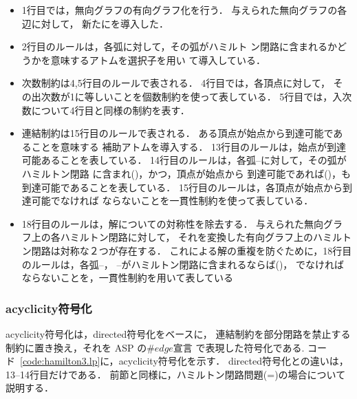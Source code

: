 \begin{itemize}
\item 1行目では，無向グラフの有向グラフ化を行う．
  与えられた無向グラフの各辺に対して，
  新たにを導入した．
\item 2行目のルールは，各弧に対して，その弧がハミルト
  ン閉路に含まれるかどうかを意味するアトムを選択子を用い
  て導入している．
\item 次数制約は4,5行目のルールで表される．
  4行目では，各頂点に対して，
  その出次数が1に等しいことを個数制約を使って表している．
  5行目では，入次数について4行目と同様の制約を表す．
\item 連結制約は15行目のルールで表される．
  ある頂点が始点から到達可能であることを意味する
  補助アトムを導入する．
  13行目のルールは，始点が到達可能あることを表している．
  14行目のルールは，各弧--に対して，その弧がハミルトン閉路
  に含まれ()，かつ，頂点が始点から
  到達可能であれば()，も到達可能であることを表している．
  15行目のルールは，各頂点が始点から到達可能でなければ
  ならないことを一貫性制約を使って表している．
\item 18行目のルールは，解についての対称性を除去する．
  与えられた無向グラフ上の各ハミルトン閉路に対して，
  それを変換した有向グラフ上のハミルトン閉路は対称な２つが存在する．
  これによる解の重複を防ぐために，18行目のルールは，各弧--，
  --がハミルトン閉路に含まれるならば()，
  でなければならないことを，一貫性制約を用いて表している
\end{itemize}

\subsubsection{\textsf{acyclicity}符号化}



\textsf{acyclicity}符号化は，\textsf{directed}符号化をベースに，
連結制約を部分閉路を禁止する制約に置き換え，それを ASP の$\#edge$宣言
で表現した符号化である.
コード~\ref{code:hamilton3.lp}に，\textsf{acyclicity}符号化を示す．
\textsf{directed}符号化との違いは，13--14行目だけである．
前節と同様に，ハミルトン閉路問題(=)の場合について説明する．

